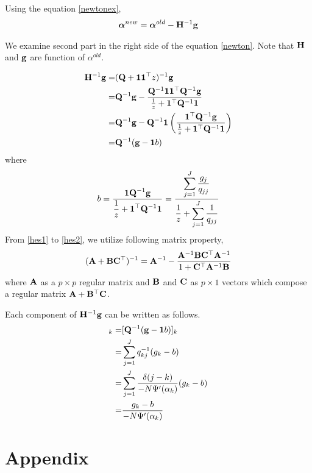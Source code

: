 \documentclass[10.5pt,letterpaper]{article}
\theoremstyle{plain}
\begin{document}
Using the equation \eqref{newtonex}, 
\begin{align}
\boldsymbol{\alpha}^{new} = \boldsymbol{\alpha}^{old} - \mathbf{H}^{-1} \mathbf{g} \label{newton}
\end{align}

We examine second part in the right side of the equation \eqref{newton}. Note that $\mathbf{H}$ and $\mathbf{g}$ are function of $\alpha^{old}$.

\begin{align}
\mathbf{H}^{-1} \mathbf{g} = & ( \mathbf{Q} + \mathbf{1} \mathbf{1} ^\top z)^{-1} \mathbf{g} \label{hes1} \\
= & \mathbf{Q}^{-1} \mathbf{g} - \frac{\mathbf{Q}^{-1} \mathbf{1} \mathbf{1} ^\top \mathbf{Q}^{-1} \mathbf{g}}{\frac{1}{z} + \mathbf{1}^\top \mathbf{Q}^{-1} \mathbf{1}} \label{hes2} \\
=& \mathbf{Q}^{-1} \mathbf{g} - \mathbf{Q}^{-1} \mathbf{1} \left( \frac{\mathbf{1}^\top \mathbf{Q}^{-1} \mathbf{g} }{\frac{1}{z} + \mathbf{1}^\top \mathbf{Q}^{-1} \mathbf{1}} \right) \\
= & \mathbf{Q}^{-1} (\mathbf{g} - \mathbf{1} b)
\end{align}
where
\begin{align}
b = \frac{\displaystyle \mathbf{1} \mathbf{Q}^{-1} \mathbf{g} }{\displaystyle \frac{1}{z} + \mathbf{1}^\top \mathbf{Q}^{-1} \mathbf{1}}
= \frac{\displaystyle \sum_{j=1}^J \frac{g_j}{q_{jj}} }{\displaystyle \frac{1}{z} + \sum_{j=1}^J \frac{1}{q_{jj}}}
\end{align}
From \eqref{hes1} to \eqref{hes2}, we utilize following matrix property,
\begin{align}
( \mathbf{A} + \mathbf{B} \mathbf{C}^\top)^{-1} = \mathbf{A}^{-1} - \frac{\mathbf{A}^{-1} \mathbf{B} \mathbf{C}^\top \mathbf{A}^{-1}}{1 + \mathbf{C}^\top \mathbf{A}^{-1} \mathbf{B}}
\end{align}
where $\mathbf{A}$ as a $p \times p$ regular matrix and $\mathbf{B}$ and $\mathbf{C}$ as $p \times 1$ vectors which compose a regular matrix $\mathbf{A} + \mathbf{B}^\top \mathbf{C}$.

Each component of $\mathbf{H}^{-1} \mathbf{g}$ can be written as follows.
\begin{align}
[\bH^{-1} \bg]_k =& [\bQ^{-1} ( \bg - \bone b)]_k \\
=& \sum_{j=1}^J q_{kj}^{-1} ( g_k - b) \\
=& \sum_{j=1}^J \frac{\delta(j-k)}{- N \Psi^\p (\alpha_k)} ( g_k - b) \\
=& \frac{ g_k - b}{- N \Psi^\p (\alpha_k)} 
\end{align}

\section{Appendix}
\end{document}
